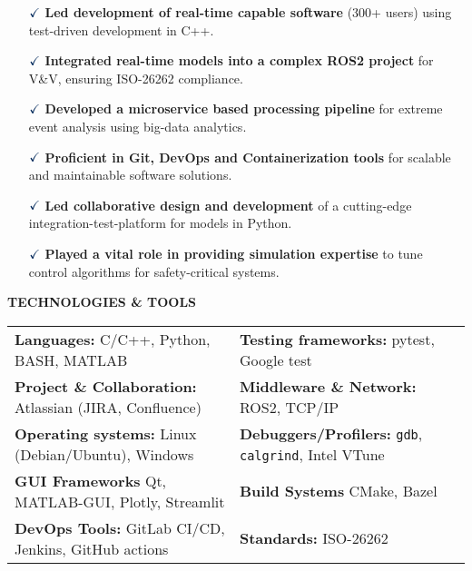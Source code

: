\documentclass[a4paper,10pt]{article}
\begin{document}
\vspace{0.1cm}
\begin{itemize}
    \item[$\textcolor{highlightcolor}{\checkmark}$] \textcolor{highlightcolor}{\textbf{Led development of real-time capable software}} (300+ users) using test-driven development in C++.
    \item[$\textcolor{highlightcolor}{\checkmark}$] \textcolor{highlightcolor}{\textbf{Integrated real-time models into a complex ROS2 project}} for V\&V, ensuring ISO-26262 compliance.
    \item[$\textcolor{highlightcolor}{\checkmark}$] \textcolor{highlightcolor}{\textbf{Developed a microservice based processing pipeline}} for extreme event analysis using big-data analytics.
    \item[$\textcolor{highlightcolor}{\checkmark}$] \textcolor{highlightcolor}{\textbf{Proficient in Git, DevOps and Containerization tools}} for scalable and maintainable software solutions.
    \item[$\textcolor{highlightcolor}{\checkmark}$] \textcolor{highlightcolor}{\textbf{Led collaborative design and development}} of a cutting-edge integration-test-platform for models in Python.
    \item[$\textcolor{highlightcolor}{\checkmark}$] \textcolor{highlightcolor}{\textbf{Played a vital role in providing simulation expertise}} to tune control algorithms for safety-critical systems.
\end{itemize}

\noindent{\rule{\linewidth}{1.4pt}}
\textbf{TECHNOLOGIES \& TOOLS}

\vspace{-0.1cm}
\noindent{\rule{\linewidth}{0.01cm}}

\vspace{-0.4cm}
\noindent
\begin{center}
    \begin{tabular}{ @{\hskip 0pt}m{} m{} }
        \textcolor{highlightcolor}{\textbf{Languages:}} C/C++, Python, BASH, MATLAB & \textcolor{highlightcolor}{\textbf{Testing frameworks:}} pytest, Google test \\ 
        \textcolor{highlightcolor}{\textbf{Project \& Collaboration:}} Atlassian (JIRA, Confluence)& \textcolor{highlightcolor}{\textbf{Middleware \& Network:}} ROS2, TCP/IP\\
        \textcolor{highlightcolor}{\textbf{Operating systems:}} Linux (Debian/Ubuntu), Windows & \textcolor{highlightcolor}{\textbf{Debuggers/Profilers:}} \verb|gdb|, \verb|calgrind|, Intel VTune \\
        \textcolor{highlightcolor}{\textbf{GUI Frameworks}} Qt, MATLAB-GUI, Plotly, Streamlit & \textcolor{highlightcolor}{\textbf{Build Systems}} CMake, Bazel\\
        \textcolor{highlightcolor}{\textbf{DevOps Tools:}} GitLab CI/CD, Jenkins, GitHub actions & \textcolor{highlightcolor}{\textbf{Standards:}} ISO-26262 \\
    \end{tabular}
\end{center}
\end{document}
